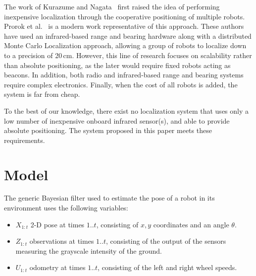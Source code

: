 \documentclass{svmult}
\begin{document}
The work of Kurazume and Nagata~\cite{kurazume1994cooperative} first raised the idea of performing inexpensive localization through the cooperative positioning of multiple robots.
Prorok et al.~\cite{prorok2012low} is a modern work representative of this approach.
These authors have used an infrared-based range and bearing hardware along with a distributed Monte Carlo Localization approach, allowing a group of robots to localize down to a precision of 20\,cm.
However, this line of research focuses on scalability rather than absolute positioning, as the later would require fixed robots acting as beacons.
In addition, both radio and infrared-based range and bearing systems require complex electronics.
Finally, when the cost of all robots is added, the system is far from cheap.

To the best of our knowledge, there exist no localization system that uses only a low number of inexpensive onboard infrared sensor(s), and able to provide absolute positioning.
The system proposed in this paper meets these requirements.

\section{Model}



The generic Bayesian filter used to estimate the pose of a robot in its environment uses the following variables:
\begin{itemize}
\item $X_{1:t}$ 2-D pose at times $1..t$, consisting of $x,y$ coordinates and an angle $\theta$.
\item $Z_{1:t}$ observations at times $1..t$, consisting of the output of the sensors measuring the grayscale intensity of the ground.
\item $U_{1:t}$ odometry at times $1..t$, consisting of the left and right wheel speeds.
\end{itemize}
\end{document}
